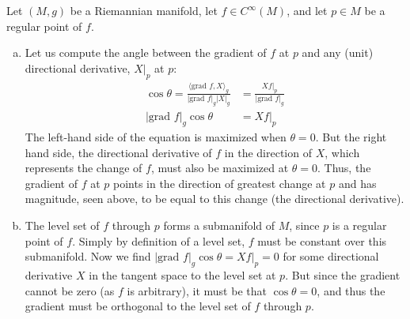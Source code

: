 \documentclass{../../mathnotes}
\begin{document}
Let $(M,g)$ be a Riemannian manifold, let $f\in C^\infty(M)$, and let $p\in M$ be a regular point of $f$.
\begin{enumerate}[(a)]
    \item Let us compute the angle between the gradient of $f$ at $p$ and any (unit) directional derivative, $X|_p$ at $p$:
        \begin{align*}
            \cos\theta=\frac{\langle \text{grad }f,X\rangle_g}{|\text{grad }f|_g|X|_g}&=\frac{Xf|_p}{|\text{grad }f|_g}\\
            |\text{grad }f|_g\cos\theta&=Xf|_p
        \end{align*}
        The left-hand side of the equation is maximized when $\theta=0$. But the right hand side, the directional derivative of
        $f$ in the direction of $X$, which represents the change of $f$, must also be maximized at $\theta=0$. Thus,
        the gradient of $f$ at $p$ points in the direction of greatest change at $p$ and has magnitude, seen above, to
        be equal to this change (the directional derivative).
    \item The level set of $f$ through $p$ forms a submanifold of $M$, since $p$ is a regular point of $f$. Simply by definition
        of a level set, $f$ must be constant over this submanifold. Now we find $|\text{grad }f|_g\cos\theta=Xf|_p=0$ for some
        directional derivative $X$ in the tangent space to the level set at $p$.
        But since the gradient cannot be zero (as $f$ is arbitrary), it must be that $\cos\theta=0$, and thus the gradient must
        be orthogonal to the level set of $f$ through $p$.
\end{enumerate}
\end{document}
